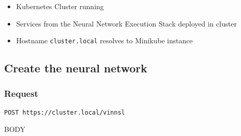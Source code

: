 \begin{itemize}
\tightlist
\item
  Kubernetes Cluster running
\item
  Services from the Neural Network Execution Stack deployed in cluster
\item
  Hostname \texttt{cluster.local} resolves to Minikube instance
\end{itemize}

\subsection{Create the neural network}\label{create-the-neural-network}

\subsubsection{Request}\label{request}

\begin{verbatim}
POST https://cluster.local/vinnsl
\end{verbatim}

BODY

